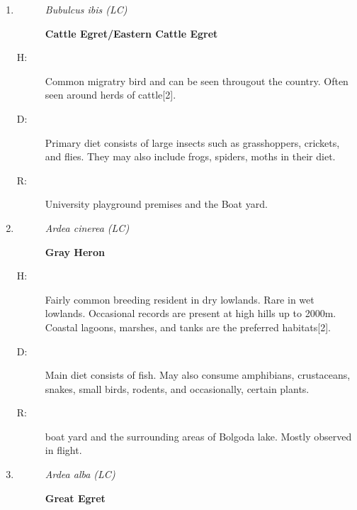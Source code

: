 \begin{itemize}
\begin{enumerate}
\begin{description}
\item[D: ]%
Fish, frogs, crabs, and insects. They are nocturnal hunters and forage in wetlands and rice paddies.%
\item[R: ]%
boat yard and the surrounding areas of Bolgoda lake.%
\end{description}%
\item%
\begin{description}%
\item[]%
\textit{Bubulcus ibis (LC)}%
\item[]%
\textbf{Cattle Egret/Eastern Cattle Egret}%
\end{description}%
\begin{description}%
\item[H: ]%
Common migratry bird and can be seen througout the country. Often seen around herds of cattle{[}2{]}.%
\item[D: ]%
Primary diet consists of large insects such as grasshoppers, crickets, and flies. They may also include frogs, spiders, moths in their diet.%
\item[R: ]%
University playground premises and the Boat yard.%
\end{description}%
\item%
\begin{description}%
\item[]%
\textit{Ardea cinerea (LC)}%
\item[]%
\textbf{Gray Heron}%
\end{description}%
\begin{description}%
\item[H: ]%
Fairly common breeding resident in dry lowlands. Rare in wet lowlands. Occasional records are present at high hills up to 2000m. Coastal lagoons, marshes, and tanks are the preferred habitats{[}2{]}.%
\item[D: ]%
Main diet consists of fish. May also consume amphibians, crustaceans, snakes, small birds, rodents, and occasionally, certain plants.%
\item[R: ]%
boat yard and the surrounding areas of Bolgoda lake. Mostly observed in flight.%
\end{description}%
\item%
\begin{description}%
\item[]%
\textit{Ardea alba (LC)}%
\item[]%
\textbf{Great Egret}%
\end{description}%
\begin{description}%

\end{description}
\end{enumerate}
\end{itemize}
